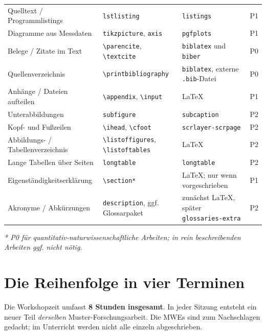 \documentclass[11pt,a4paper,parskip=half]{scrartcl} %
\newcommand{\pkg}[1]{\texttt{#1}}
\begin{document}
{\begin{longtable}{@{}p{.24\linewidth}p{.30\linewidth}p{.28\linewidth}p{.08\linewidth}@{}}
Quelltext / Programmlistings & \texttt{lstlisting} & \pkg{listings} & P1\\
Diagramme aus Messdaten & \texttt{tikzpicture}, \texttt{axis} & \pkg{pgfplots} & P1\\
Belege / Zitate im Text & \texttt{\textbackslash parencite}, \texttt{\textbackslash textcite} & \pkg{biblatex} und \pkg{biber} & P0\\
Quellenverzeichnis & \texttt{\textbackslash printbibliography} & \pkg{biblatex}, externe \texttt{.bib}-Datei & P0\\
Anhänge / Dateien aufteilen & \texttt{\textbackslash appendix}, \texttt{\textbackslash input} & LaTeX & P1\\
Unterabbildungen & \texttt{subfigure} & \pkg{subcaption} & P2\\
Kopf- und Fußzeilen & \texttt{\textbackslash ihead}, \texttt{\textbackslash cfoot} & \pkg{scrlayer-scrpage} & P2\\
Abbildungs- / Tabellenverzeichnis & \texttt{\textbackslash listoffigures}, \texttt{\textbackslash listoftables} & LaTeX & P2\\
Lange Tabellen über Seiten & \texttt{longtable} & \pkg{longtable} & P2\\
Eigenständigkeitserklärung & \texttt{\textbackslash section*} & LaTeX; nur wenn vorgeschrieben & P1\\
Akronyme / Abkürzungen & \texttt{description}, ggf. Glossarpaket & zunächst LaTeX, später \pkg{glossaries-extra} & P2\\
\bottomrule
\end{longtable}
}
\noindent\textit{* P0 für quantitativ-naturwissenschaftliche Arbeiten; in rein
beschreibenden Arbeiten ggf. nicht nötig.}

\section{Die Reihenfolge in vier Terminen}
\label{sec:termine}
Die Workshopzeit umfasst \textbf{8 Stunden insgesamt}. In jeder Sitzung
entsteht ein neuer Teil \emph{derselben} Muster-Forschungsarbeit. Die MWEs sind
zum Nachschlagen gedacht; im Unterricht werden nicht alle einzeln abgeschrieben.
\end{document}
